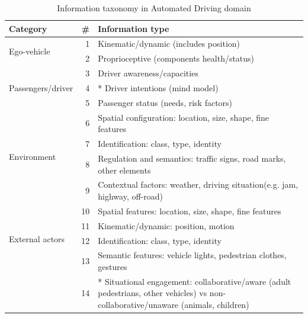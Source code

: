 \begin{table}%
    \caption{Information taxonomy in Automated Driving domain}
    \label{tab:info-taxonomy}
    \begin{tabular*}{\linewidth}{lr p{5.5cm}} %
        \hline %
        \textbf{Category} & \textbf{\#}	& \textbf{Information type}	\\
        \hline %
        \multirow{2}{*}{Ego-vehicle}
         & 1 & Kinematic/dynamic (includes position) \\
         & 2 & Proprioceptive (components health/status) \\
         \hline %
         \multirow{3}{*}{Passengers/driver}
         & 3 & Driver awareness/capacities \\
         & 4 & * Driver intentions (mind model)  \\
         & 5 & Passenger status (needs, risk factors) \\
         \hline %
         \multirow{4}{*}{Environment}
         & 6 & Spatial configuration: location, size, shape, fine features 
         \\
         & 7 & Identification: class, type, identity \\
         & 8 & Regulation and semantics: traffic signs, road marks, other 
         elements \\
         & 9 & Contextual factors: weather, driving situation(e.g. jam, 
         highway, off-road) \\
         \hline %
         \multirow{4}{*}{External actors}
         & 10 & Spatial features: location, size, shape, fine features  \\
         & 11 & Kinematic/dynamic: position, motion \\
         & 12 & Identification: class, type, identity \\ 
         & 13 & Semantic features: vehicle lights, pedestrian clothes, gestures 
         \\
         & 14 & * Situational engagement: collaborative/aware 
         (adult pedestrians, other vehicles) vs non-collaborative/unaware 
         (animals, children) \\ 
        \hline %
    \end{tabular*}
\end{table}

